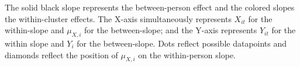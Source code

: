 \begin{center}

    \label{fig:withinbetween-binxy}
    \begin{figurenote}
        The solid black slope represents the between-person effect and the colored slopes the within-cluster effects. The X-axis simultaneously represents $X_{it}$ for the within-slope and $\mu_{X,i}$ for the between-slope; and the Y-axis represents $Y_{it}$ for the within slope and $Y_i$ for the between-slope. Dots reflect possible datapoints and diamonds reflect the position of $\mu_{X,i}$ on the within-person slope.
    \end{figurenote}
\end{center}